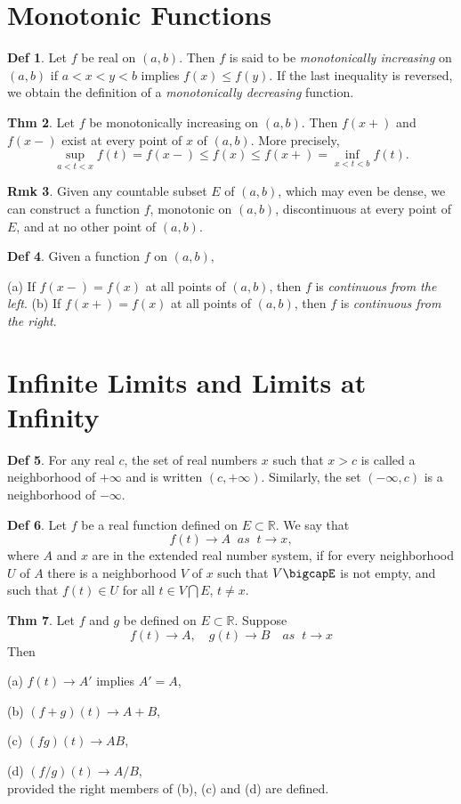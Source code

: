 \documentclass{article}
\theoremstyle{definition}
\newtheorem{definition}{Def}
\newtheorem{theorem}[definition]{Thm}
\newtheorem{remarks}[definition]{Rmk}
\begin{document}
\section{Monotonic Functions}
\begin{definition}
    Let $f$ be real on $(a, b)$. Then $f$ is said to be \textit{monotonically increasing} on $(a, b)$ if $a<x<y<b$ implies $f(x)\leq f(y)$. If the last inequality is reversed, we obtain the definition of a \textit{monotonically decreasing} function.
\end{definition}
\begin{theorem}
    Let $f$ be monotonically increasing on $(a,b)$. Then $f(x+)$ and $f(x-)$ exist at every point of $x$ of $(a,b)$. More precisely,
    \[
    \sup_{a<t<x}f(t)=f(x-)\leq f(x) \leq f(x+)=\inf_{x<t<b}f(t).
    \]
\end{theorem}
\begin{remarks}
    Given any countable subset $E$ of $(a,b)$, which may even be dense, we can construct a function $f$, monotonic on $(a,b)$, discontinuous at every point of $E$, and at no other point of $(a,b)$.
\end{remarks}
\begin{definition}
    Given a function $f$ on $(a,b)$,\par
    (a) If $f(x-)=f(x)$ at all points of $(a,b)$, then $f$ is \textit{continuous from the left}.
    (b) If $f(x+)=f(x)$ at all points of $(a,b)$, then $f$ is \textit{continuous from the right}.
\end{definition}

\section{Infinite Limits and Limits at Infinity}
\begin{definition}
    For any real $c$, the set of real numbers $x$ such that $x>c$ is called a neighborhood of $+\infty$ and is written $(c,+\infty)$. Similarly, the set $(-\infty,c)$ is a neighborhood of $-\infty$.
\end{definition}
\begin{definition}
    Let $f$ be a real function defined on $E\subset \mathbb{R}$. We say that
    \[
    f(t)\to A\;\;as \;\;t\to x,
    \]
    where $A$ and $x$ are in the extended real number system, if for every neighborhood $U$ of $A$ there is a neighborhood $V$ of $x$ such that $V\bigcapE$ is not empty, and such that $f(t)\in U$ for all $t\in V\bigcap E$, $t\neq x$.
\end{definition}
\begin{theorem}
    Let $f$ and $g$ be defined on $E\subset \mathbb{R}$. Suppose
    \[
    f(t)\to A,\quad g(t)\to B\quad as\;\;t\to x
    \]
    Then\par
    (a) $f(t)\to A'$ implies $A'=A$,\par
    (b) $(f+g)(t)\to A+B$,\par
    (c) $(fg)(t)\to AB$,\par
    (d) $(f/g)(t)\to A/B$,\\
    provided the right members of (b), (c) and (d) are defined.
\end{theorem}
\end{document}
